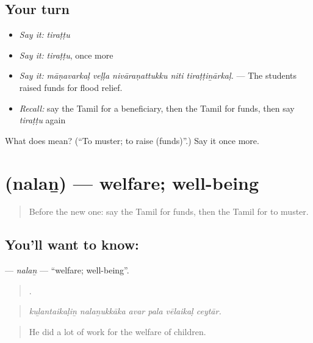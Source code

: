 \subsection*{Your turn}
\begin{itemize}
\raggedright
  \item \emph{Say it:} \emph{tiraṭṭu}
  \item \emph{Say it:} \emph{tiraṭṭu}, once more
  \item \emph{Say it:} \emph{māṇavarkaḷ veḷḷa nivāraṇattukku niti tiraṭṭiṉārkaḷ.} — The students raised funds for flood relief.
  \item \emph{Recall:} say the Tamil for a beneficiary, then the Tamil for funds, then say \emph{tiraṭṭu} again
\end{itemize}

\begin{tcolorbox}[breakable,colback=teal!4,colframe=teal!35!black,title={Before you move on}]
What does  mean? (\textquotedblleft{}To muster; to raise (funds)\textquotedblright{}.) Say it once more.
\end{tcolorbox}
\section[\texorpdfstring{\ta{நலன்} (nalaṉ)}{நலன் (nalaṉ)}]{ (nalaṉ) — welfare; well-being}

\label{lesson:TA-C379-nalan}



\begin{quote}
Before the new one: say the Tamil for funds, then the Tamil for to muster.
\end{quote}

\subsection*{You'll want to know: }
\textbf{} — \emph{nalaṉ} — \textquotedblleft{}welfare; well-being\textquotedblright{}.

\begin{quote}
     .
\end{quote}

\begin{quote}
\emph{kuḻantaikaḷiṉ nalaṉukkāka avar pala vēlaikaḷ ceytār.}
\end{quote}

\begin{quote}
He did a lot of work for the welfare of children.
\end{quote}

